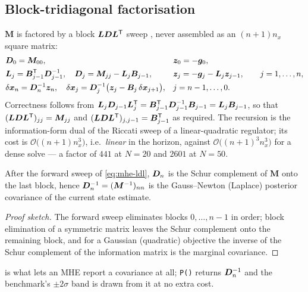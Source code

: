 \subsection{Block-tridiagonal factorisation}
$\bm{M}$ is factored by a block $\bm{L}\bm{D}\bm{L}^{\mathsf{T}}$ sweep \citep[\S4.3]{golubvanloan2013}, never assembled
as an $(n{+}1)n_x$ square matrix:
\begin{equation}\label{eq:mhe-ldl}
\begin{aligned}
&\bm{D}_0 = \bm{M}_{00}, &&\bm{z}_0 = -\bm{g}_0, \\
&\bm{L}_j = \bm{B}_{j-1}^{\mathsf{T}}\bm{D}_{j-1}^{-1}, \quad
 \bm{D}_j = \bm{M}_{jj} - \bm{L}_j\bm{B}_{j-1}, &&\bm{z}_j = -\bm{g}_j - \bm{L}_j\bm{z}_{j-1},
 \qquad j = 1,\dots,n, \\
&\delta\bm{x}_n = \bm{D}_n^{-1}\bm{z}_n, \quad
 \delta\bm{x}_j = \bm{D}_j^{-1}\bigl(\bm{z}_j - \bm{B}_j\,\delta\bm{x}_{j+1}\bigr), && j = n-1,\dots,0 .
\end{aligned}
\end{equation}
Correctness follows from $\bm{L}_j\bm{D}_{j-1}\bm{L}_j^{\mathsf{T}} = \bm{B}_{j-1}^{\mathsf{T}}\bm{D}_{j-1}^{-1}\bm{B}_{j-1} = \bm{L}_j\bm{B}_{j-1}$,
so that $(\bm{L}\bm{D}\bm{L}^{\mathsf{T}})_{jj} = \bm{M}_{jj}$ and $(\bm{L}\bm{D}\bm{L}^{\mathsf{T}})_{j,j-1} = \bm{B}_{j-1}^{\mathsf{T}}$ as required.
The recursion is the information-form dual of the Riccati sweep of a linear-quadratic regulator;
its cost is $\mathcal{O}\bigl((n{+}1)n_x^3\bigr)$, i.e.\ \emph{linear} in the horizon, against
$\mathcal{O}\bigl((n{+}1)^3 n_x^3\bigr)$ for a dense solve --- a factor of $441$ at $N = 20$ and
$2601$ at $N = 50$.

\begin{proposition}\label{prop:mhe-marg}
After the forward sweep of \cref{eq:mhe-ldl}, $\bm{D}_n$ is the Schur complement of $\bm{M}$ onto the last
block, hence $\bm{D}_n^{-1} = (\bm{M}^{-1})_{nn}$ is the Gauss--Newton (Laplace) posterior covariance of
the current state estimate.
\end{proposition}
\begin{proof}[Proof sketch]
The forward sweep eliminates blocks $0,\dots,n-1$ in order; block elimination of a symmetric matrix
leaves the Schur complement onto the remaining block, and for a Gaussian (quadratic) objective the
inverse of the Schur complement of the information matrix is the marginal covariance.
\end{proof}
 is what lets an MHE report a covariance at all; \texttt{P()} returns
$\bm{D}_n^{-1}$ and the benchmark's $\pm2\sigma$ band is drawn from it at no extra cost.

